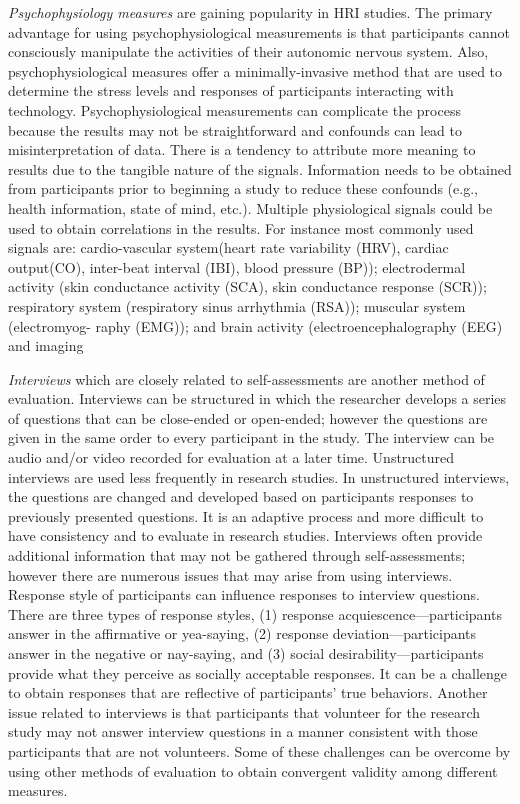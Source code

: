 \emph{Psychophysiology measures} are gaining popularity in HRI studies. The primary advantage for using psychophysiological measurements is that participants cannot consciously manipulate the activities of their autonomic nervous system. Also, psychophysiological measures offer a minimally-invasive method that are used to determine the stress levels and responses of participants interacting with technology. Psychophysiological measurements can complicate the process because the results may not be straightforward and confounds can lead to misinterpretation of data. There is a tendency to attribute more meaning to results due to the tangible nature of the signals. Information needs to be obtained from participants prior to beginning a study to reduce these confounds (e.g., health information, state of mind, etc.). Multiple physiological signals could be used to obtain correlations in the results. For instance most commonly used signals are: cardio-vascular system(heart rate variability (HRV), cardiac output(CO), inter-beat interval (IBI), blood pressure (BP)); electrodermal activity (skin conductance activity (SCA), skin conductance response (SCR)); respiratory system (respiratory sinus arrhythmia (RSA)); muscular system (electromyog- raphy (EMG)); and brain activity (electroencephalography (EEG) and imaging

\emph{Interviews} which are closely related to self-assessments are another method of evaluation. Interviews can be structured in which the researcher develops a series of questions that can be close-ended or open-ended; however the questions are given in the same order to every participant in the study. The interview can be audio and/or video recorded for evaluation at a later time. Unstructured interviews are used less frequently in research studies. In unstructured interviews, the questions are changed and developed based on participants responses to previously presented questions. It is an adaptive process and more difficult to have consistency and to evaluate in research studies. Interviews often provide additional information that may not be gathered through self-assessments; however there are numerous issues that may arise from using interviews. Response style of participants can influence responses to interview questions. There are three types of response styles, (1) response acquiescence—participants answer in the affirmative or yea-saying, (2) response deviation—participants answer in the negative or nay-saying, and (3) social desirability—participants provide what they perceive as socially acceptable responses. It can be a challenge to obtain responses that are reflective of participants’ true behaviors. Another issue related to interviews is that participants that volunteer for the research study may not answer interview questions in a manner consistent with those participants that are not volunteers. Some of these challenges can be overcome by using other methods of evaluation to obtain convergent validity among different measures.

